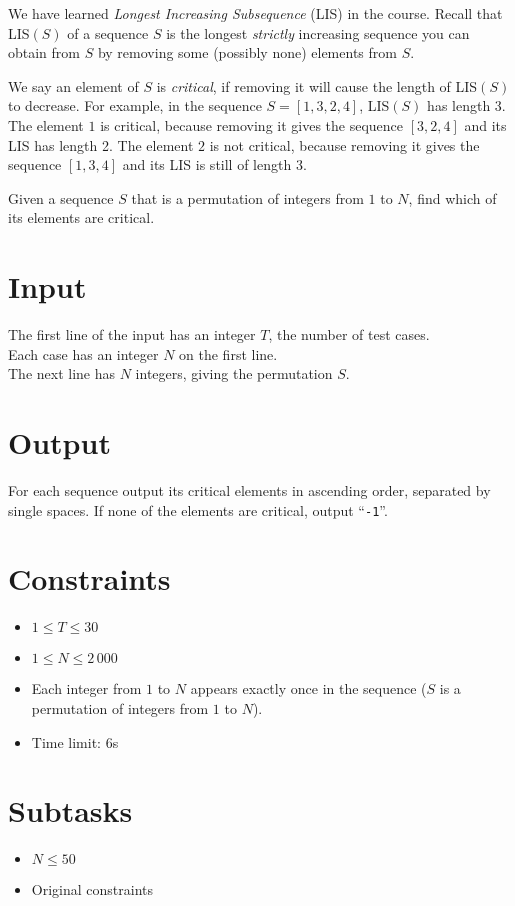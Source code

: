 
We have learned {\it Longest Increasing Subsequence} (LIS) in the course.
Recall that LIS$(S)$ of a sequence $S$ is the longest {\it strictly} increasing sequence you can obtain from $S$ by removing some (possibly none) elements from $S$.

We say an element of $S$ is {\it critical}, if removing it will cause the length of LIS$(S)$ to decrease.
For example, in the sequence $S = [1, 3, 2, 4]$, LIS$(S)$ has length 3.
The element $1$ is critical, because removing it gives the sequence $[3, 2, 4]$ and its LIS has length 2.
The element $2$ is not critical, because removing it gives the sequence $[1, 3, 4]$ and its LIS is still of length 3.

Given a sequence $S$ that is a permutation of integers from $1$ to $N$, find which of its elements are critical.
\section*{Input}

The first line of the input has an integer $T$, the number of test cases.\\
Each case has an integer $N$ on the first line.\\
The next line has $N$ integers, giving the permutation $S$.

\section*{Output}
For each sequence output its critical elements in ascending order, separated by single spaces. If none of the elements are critical, output ``{\tt -1}''.

\section*{Constraints}
\begin{itemize}
\item $1 \leq T\leq 30$
\item $1 \leq N \leq 2\,000$
\item Each integer from $1$ to $N$ appears exactly once in the sequence ($S$ is a permutation of integers from $1$ to $N$).
\item Time limit: 6s
\end{itemize}

\section*{Subtasks}
\begin{itemize}
  \item $N \leq 50$
  \item Original constraints
\end{itemize}
